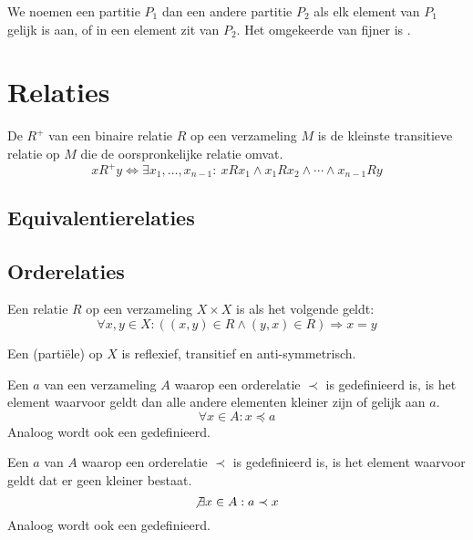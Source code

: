 \documentclass[main.tex]{subfiles}
\begin{document}
\begin{de}
  We noemen een partitie $P_{1}$  dan een andere partitie $P_{2}$ als elk element van $P_{1}$ gelijk is aan, of in een element zit van $P_{2}$.
  Het omgekeerde van fijner is .
\end{de}

\section{Relaties}
\label{sec:relaties}

\begin{de}
  De  $R^{+}$ van een binaire relatie $R$ op een verzameling $M$ is de kleinste transitieve relatie op $M$ die de oorspronkelijke relatie omvat.
  \[ xR^{+}y \Leftrightarrow \exists x_{1},\dotsc,x_{n-1}:\ xRx_{1} \wedge x_{1}Rx_{2} \wedge \dotsb \wedge x_{n-1} R y \]
\end{de}

\subsection{Equivalentierelaties}


\subsection{Orderelaties}

\begin{de}
  Een relatie $R$ op een verzameling $X \times X$ is  als het volgende geldt:
  \[ \forall x,y \in X: ((x,y) \in R \wedge (y,x) \in R) \Rightarrow x = y \]
\end{de}

\begin{de}
  Een (parti\"ele)  op $X$ is reflexief, transitief en anti-symmetrisch.
\end{de}

\begin{de}
  Een  $a$ van een verzameling $A$ waarop een orderelatie $\prec$ is gedefinieerd is, is het element waarvoor geldt dan alle andere elementen kleiner zijn of gelijk aan $a$.
  \[ \forall x \in A: x \preceq a \] 
  Analoog wordt ook een  gedefinieerd.
\end{de}

\begin{de}
  Een  $a$ van $A$ waarop een orderelatie $\prec$ is gedefinieerd is, is het element waarvoor geldt dat er geen kleiner bestaat.
  \[ \not\exists x \in A: a \prec x \]
  Analoog wordt ook een  gedefinieerd.
\end{de}
\end{document}
